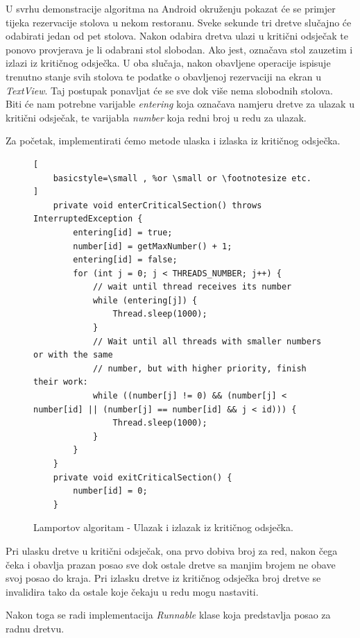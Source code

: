 \documentclass[times, utf8, zavrsni]{fer}
\begin{document}
U svrhu demonstracije algoritma na Android okruženju pokazat će se primjer tijeka rezervacije stolova u nekom restoranu. Sveke sekunde tri dretve slučajno će odabirati jedan od pet stolova. Nakon odabira dretva ulazi u kritični odsječak te ponovo provjerava je li odabrani stol slobodan. Ako jest, označava stol zauzetim i izlazi iz kritičnog odsječka. U oba slučaja, nakon obavljene operacije ispisuje trenutno stanje svih stolova te podatke o obavljenoj rezervaciji na ekran u \textit{TextView}. Taj postupak ponavljat će se sve dok više nema slobodnih stolova.\\

Biti će nam potrebne varijable \textit{entering} koja označava namjeru dretve za ulazak u kritični odsječak, te varijabla \textit{number} koja redni broj u redu za ulazak.\newpage


Za početak, implementirati ćemo metode ulaska i izlaska iz kritičnog odsječka.

\begin{figure}[ht!]
\begin{lstlisting}[
    basicstyle=\small , %or \small or \footnotesize etc.
]
    private void enterCriticalSection() throws InterruptedException {
        entering[id] = true;
        number[id] = getMaxNumber() + 1;
        entering[id] = false;
        for (int j = 0; j < THREADS_NUMBER; j++) {
            // wait until thread receives its number
            while (entering[j]) {
                Thread.sleep(1000);
            }
            // Wait until all threads with smaller numbers or with the same
            // number, but with higher priority, finish their work:
            while ((number[j] != 0) && (number[j] < number[id] || (number[j] == number[id] && j < id))) {
                Thread.sleep(1000);
            }
        }
    }
    private void exitCriticalSection() {
        number[id] = 0;
	}
\end{lstlisting}
\caption{Lamportov algoritam - Ulazak i izlazak iz kritičnog odsječka.}
\label{overflow}
\end{figure}

Pri ulasku dretve u kritični odsječak, ona prvo dobiva broj za red, nakon čega čeka i obavlja prazan posao sve dok ostale dretve sa manjim brojem ne obave svoj posao do kraja. Pri izlasku dretve iz kritičnog odsječka broj dretve se invalidira tako da ostale koje čekaju u redu mogu nastaviti.\newpage

Nakon toga se radi implementacija \textit{Runnable} klase koja predstavlja posao za radnu dretvu.
\end{document}
